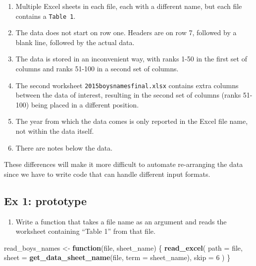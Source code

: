 \documentclass[]{book}
\newenvironment{Shaded}{\begin{snugshade}}{\end{snugshade}}
\newcommand{\KeywordTok}[1]{\textcolor[rgb]{0.13,0.29,0.53}{\textbf{#1}}}
\newcommand{\DataTypeTok}[1]{\textcolor[rgb]{0.13,0.29,0.53}{#1}}
\newcommand{\DecValTok}[1]{\textcolor[rgb]{0.00,0.00,0.81}{#1}}
\newcommand{\StringTok}[1]{\textcolor[rgb]{0.31,0.60,0.02}{#1}}
\newcommand{\ControlFlowTok}[1]{\textcolor[rgb]{0.13,0.29,0.53}{\textbf{#1}}}
\newcommand{\NormalTok}[1]{#1}
\providecommand{\tightlist}{%
  \setlength{\itemsep}{0pt}\setlength{\parskip}{0pt}}
\begin{document}
\begin{enumerate}
\def\labelenumi{\arabic{enumi}.}
\tightlist
\item
  Multiple Excel sheets in each file, each with a different name, but
  each file contains a \texttt{Table\ 1}.
\item
  The data does not start on row one. Headers are on row 7, followed by
  a blank line, followed by the actual data.
\item
  The data is stored in an inconvenient way, with ranks 1-50 in the
  first set of columns and ranks 51-100 in a second set of columns.
\item
  The second worksheet \texttt{2015boysnamesfinal.xlsx} contains extra
  columns between the data of interest, resulting in the second set of
  columns (ranks 51-100) being placed in a different position.
\item
  The year from which the data comes is only reported in the Excel file
  name, not within the data itself.
\item
  There are notes below the data.
\end{enumerate}

These differences will make it more difficult to automate re-arranging
the data since we have to write code that can handle different input
formats.

\subsection{Ex 1: prototype}\label{ex-1-prototype-3}

\begin{enumerate}
\def\labelenumi{\arabic{enumi}.}
\tightlist
\item
  Write a function that takes a file name as an argument and reads the
  worksheet containing ``Table 1'' from that file.
\end{enumerate}

\begin{Shaded}
\begin{Highlighting}[]
\NormalTok{read_boys_names <-}\StringTok{ }\ControlFlowTok{function}\NormalTok{(file, sheet_name) \{}
  \KeywordTok{read_excel}\NormalTok{(}
    \DataTypeTok{path =}\NormalTok{ file,}
    \DataTypeTok{sheet =} \KeywordTok{get_data_sheet_name}\NormalTok{(file, }\DataTypeTok{term =}\NormalTok{ sheet_name),}
    \DataTypeTok{skip =} \DecValTok{6}
\NormalTok{  )}
\NormalTok{\}}
\end{Highlighting}
\end{Shaded}
\end{document}
